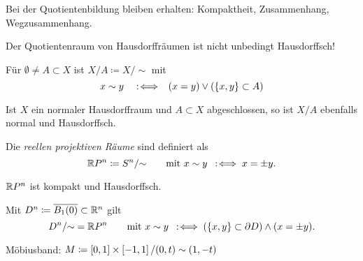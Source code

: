 \documentclass{cheat-sheet}
\begin{document}
\begin{bem}
  Bei der Quotientenbildung bleiben erhalten: Kompaktheit, Zusammenhang, Wegzusammenhang.
\end{bem}

\begin{acht}
  Der Quotientenraum von Hausdorffräumen ist nicht unbedingt Hausdorffsch!
\end{acht}

\begin{nota}
  Für $\emptyset \not= A \subset X$ ist $X/A \coloneqq X/{\sim}$ mit
  \[ x \sim y \enspace \enspace:\!\iff \enspace (x = y) \vee (\{ x, y \} \subset A) \]
\end{nota}

\begin{prop}
  Ist $X$ ein normaler Hausdorffraum und $A \subset X$ abgeschlossen, so ist $X/A$ ebenfalls normal und Hausdorffsch.
\end{prop}


\begin{defn}
  Die \emph{reellen projektiven Räume} sind definiert als
  \[ \mathbb{R} P^n \coloneqq S^n/{\sim} \qquad \text{mit } x \sim y \enspace:\!\iff x = \pm y. \]
\end{defn}

\begin{prop}
  $\mathbb{R} P^n$ ist kompakt und Hausdorffsch.
\end{prop}

\begin{bem}
  Mit $D^n \coloneqq \overline{B_1(0)} \subset \mathbb{R}^n$ gilt
  \[ D^n / {\sim} = \mathbb{R} P^n \qquad \text{mit } x \sim y \enspace:\!\iff (\{ x, y \} \subset \partial D) \wedge (x = \pm y). \]
\end{bem}


\begin{bsp}
  Möbiusband: $M \coloneqq \left[ 0, 1 \right] \times \left[ -1, 1 \right] / (0, t) \sim (1, -t)$
\end{bsp}

\end{document}
